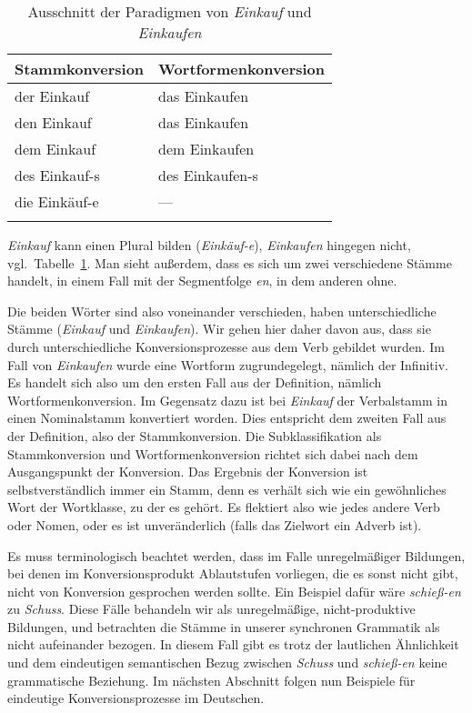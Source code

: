 \begin{table}
  \centering
  \begin{tabular}{ll}
    \lsptoprule
    \textbf{Stammkonversion} & \textbf{Wortformenkonversion} \\
    \midrule
    der Einkauf & das Einkaufen\\
    den Einkauf & das Einkaufen\\
    dem Einkauf & dem Einkaufen\\
    des Einkauf-s & des Einkaufen-s\\
    die Einkäuf-e & --- \\
    \lspbottomrule
  \end{tabular}
  \caption{Ausschnitt der Paradigmen von \textit{Einkauf} und \textit{Einkaufen}}
  \label{tab:einkauf-en}
\end{table}


\textit{Einkauf} kann einen Plural bilden (\textit{Einkäuf-e}), \textit{Einkaufen} hingegen nicht, vgl.\ Tabelle~\ref{tab:einkauf-en}.
Man sieht außerdem, dass es sich um zwei verschiedene Stämme handelt, in einem Fall mit der Segmentfolge \textit{en}, in dem anderen ohne.

Die beiden Wörter sind also voneinander verschieden, haben unterschiedliche Stämme (\textit{Einkauf} und \textit{Einkaufen}).
Wir gehen hier daher davon aus, dass sie durch unterschiedliche Konversionsprozesse aus dem Verb gebildet wurden.
Im Fall von \textit{Einkaufen} wurde eine Wortform zugrundegelegt, nämlich der Infinitiv.
Es handelt sich also um den ersten Fall aus der Definition, nämlich Wortformenkonversion.
Im Gegensatz dazu ist bei \textit{Einkauf} der Verbalstamm in einen Nominalstamm konvertiert worden.
Dies entspricht dem zweiten Fall aus der Definition, also der Stammkonversion.
Die Subklassifikation als Stammkonversion und Wortformenkonversion richtet sich dabei nach dem Ausgangspunkt der Konversion.
Das Ergebnis der Konversion ist selbstverständlich immer ein Stamm, denn es verhält sich wie ein gewöhnliches Wort der Wortklasse, zu der es gehört.
Es flektiert also wie jedes andere Verb oder Nomen, oder es ist unveränderlich (falls das Zielwort \zB ein Adverb ist).

Es muss terminologisch beachtet werden, dass im Falle unregelmäßiger Bildungen, bei denen \zB im Konversionsprodukt Ablautstufen vorliegen, die es sonst nicht gibt, nicht von Konversion gesprochen werden sollte.
Ein Beispiel dafür wäre \textit{schieß-en} zu \textit{Schuss}.
Diese Fälle behandeln wir als unregelmäßige, nicht-pro\-duk\-ti\-ve Bildungen, und betrachten die Stämme in unserer synchronen Grammatik als nicht aufeinander bezogen.
In diesem Fall gibt es trotz der lautlichen Ähnlichkeit und dem eindeutigen semantischen Bezug zwischen \textit{Schuss} und \textit{schieß-en} keine grammatische Beziehung.
Im nächsten Abschnitt folgen nun Beispiele für eindeutige Konversionsprozesse im Deutschen.


